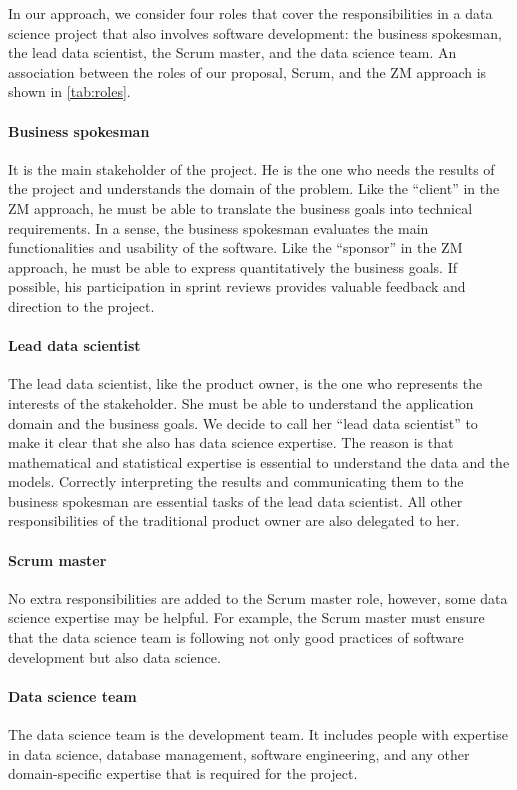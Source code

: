 In our approach, we consider four roles that cover the responsibilities in a data science
project that also involves software development: the business spokesman, the lead data
scientist, the Scrum master, and the data science team.  An association between the roles of
our proposal, Scrum, and the ZM approach is shown in \cref{tab:roles}.

\paragraph{Business spokesman}  It is the main stakeholder of the project.
He is the one who needs the results of the project and understands the domain of the
problem.  Like the ``client'' in the ZM approach, he must be able to translate the business
goals into technical requirements.  In a sense, the business spokesman evaluates the main
functionalities and usability of the software.  Like the ``sponsor'' in the ZM approach, he
must be able to express quantitatively the business goals.  If possible, his participation
in sprint reviews provides valuable feedback and direction to the project.

\paragraph{Lead data scientist}  The lead data scientist, like the product owner, is the
one who represents the interests of the stakeholder.  She must be able to understand the
application domain and the business goals.  We decide to call her ``lead data scientist''
to make it clear that she also has data science expertise.  The reason is that mathematical
and statistical expertise is essential to understand the data and the models.
Correctly interpreting the results and communicating them to the business spokesman are
essential tasks of the lead data scientist.  All other responsibilities of the traditional
product owner are also delegated to her.

\paragraph{Scrum master} No extra responsibilities are added to the Scrum master role,
however, some data science expertise may be helpful.  For example, the Scrum master must
ensure that the data science team is following not only good practices of software
development but also data science.

\paragraph{Data science team}  The data science team is the development team.  It includes
people with expertise in data science, database management, software engineering, and any
other domain-specific expertise that is required for the project.

